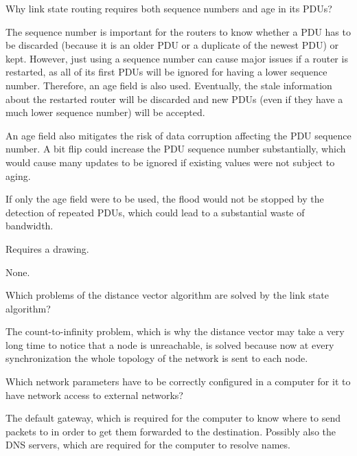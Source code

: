 \begin{Exercise}
Why link state routing requires both sequence numbers and age in its PDUs?
\end{Exercise}
\begin{Answer}
The sequence number is important for the routers to know whether a PDU has to be discarded (because it is an older PDU or a duplicate of the newest PDU) or kept.
However, just using a sequence number can cause major issues if a router is restarted, as all of its first PDUs will be ignored for having a lower sequence number.
Therefore, an age field is also used. Eventually, the stale information about the restarted router will be discarded and new PDUs (even if they have a much lower sequence number) will be accepted.

An age field also mitigates the risk of data corruption affecting the PDU sequence number. A bit flip could increase the PDU sequence number substantially, which would cause many updates to be ignored if existing values were not subject to aging.

If only the age field were to be used, the flood would not be stopped by the detection of repeated PDUs, which could lead to a substantial waste of bandwidth.
\end{Answer}

\begin{Exercise}
Requires a drawing.
\end{Exercise}
\begin{Answer}
None.
\end{Answer}

\begin{Exercise}
Which problems of the distance vector algorithm are solved by the link state algorithm?
\end{Exercise}
\begin{Answer}
The count-to-infinity problem, which is why the distance vector may take a very long time to notice that a node is unreachable, is solved because now at every synchronization the whole topology of the network is sent to each node.
\end{Answer}

\begin{Exercise}
Which network parameters have to be correctly configured in a computer for it to have network access to external networks?
\end{Exercise}
\begin{Answer}
The default gateway, which is required for the computer to know where to send packets to in order to get them forwarded to the destination.
Possibly also the DNS servers, which are required for the computer to resolve names.
\end{Answer}

